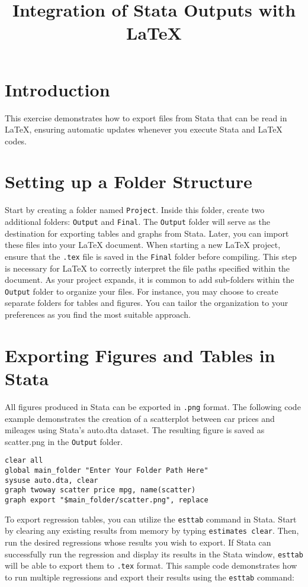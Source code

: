 \documentclass{article}
\title{Integration of Stata Outputs with {\LaTeX}}
\author{}
\date{}
\begin{document}
\maketitle

\section{Introduction}
This exercise demonstrates how to export files from Stata that can be read in {\LaTeX}, ensuring automatic updates whenever you execute Stata and {\LaTeX} codes.

\section{Setting up a Folder Structure}
Start by creating a folder named \texttt{Project}. Inside this folder, create two additional folders: \texttt{Output} and \texttt{Final}. The \texttt{Output} folder will serve as the destination for exporting tables and graphs from Stata. Later, you can import these files into your {\LaTeX} document. When starting a new {\LaTeX} project, ensure that the \texttt{.tex} file is saved in the \texttt{Final} folder before compiling. This step is necessary for {\LaTeX} to correctly interpret the file paths specified within the document. As your project expands, it is common to add sub-folders within the \texttt{Output} folder to organize your files. For instance, you may choose to create separate folders for tables and figures. You can tailor the organization to your preferences as you find the most suitable approach.

\section{Exporting Figures and Tables in Stata}
All figures produced in Stata can be exported in \texttt{.png} format. The following code example demonstrates the creation of a scatterplot between car prices and mileages using Stata's auto.dta dataset. The resulting figure is saved as scatter.png in the \texttt{Output} folder.

\begin{verbatim}
clear all
global main_folder "Enter Your Folder Path Here"
sysuse auto.dta, clear
graph twoway scatter price mpg, name(scatter)
graph export "$main_folder/scatter.png", replace
\end{verbatim}

To export regression tables, you can utilize the \texttt{esttab} command in Stata. Start by clearing any existing results from memory by typing \texttt{estimates clear}. Then, run the desired regressions whose results you wish to export. If Stata can successfully run the regression and display its results in the Stata window, \texttt{esttab} will be able to export them to \texttt{.tex} format. This sample code demonstrates how to run multiple regressions and export their results using the \texttt{esttab} command:
\end{document}
